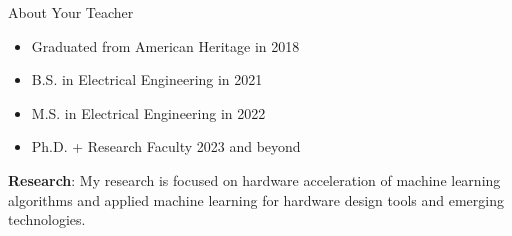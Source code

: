 \documentclass[aspectratio=169]{beamer}
\begin{document}
\begin{frame}{About Your Teacher}

    \begin{itemize}
        \item Graduated from American Heritage in 2018
        \item B.S. in Electrical Engineering in 2021
        \item M.S. in Electrical Engineering in 2022
        \item Ph.D. + Research Faculty 2023 and beyond
    \end{itemize}

    \textbf{Research}: My research is focused on hardware acceleration of machine learning algorithms and applied machine learning for hardware design tools and emerging technologies.

    \vspace{\baselineskip}


\end{frame}
\end{document}
